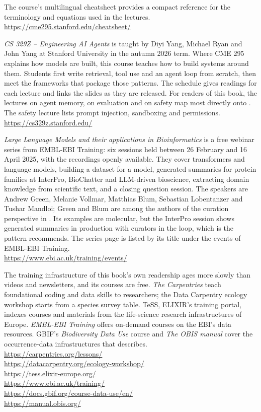 The course's multilingual cheatsheet provides a compact reference for the
terminology and equations used in the lectures.\\
\url{https://cme295.stanford.edu/cheatsheet/}

\emph{CS 329Z -- Engineering AI Agents} is taught by Diyi Yang, Michael Ryan
and John Yang at Stanford University in the autumn 2026 term. Where CME 295
explains how models are built, this course teaches how to build systems
around them. Students first write retrieval, tool use and an agent loop from
scratch, then meet the frameworks that package those patterns. The schedule
gives readings for each lecture and links the slides as they are released.
For readers of this book, the lectures on agent memory, on evaluation and on
safety map most directly onto . The
safety lecture lists prompt injection, sandboxing and permissions.\\
\url{https://cs329z.stanford.edu/}

\emph{Large Language Models and their applications in Bioinformatics} is a
free webinar series from EMBL-EBI Training: six sessions held between
26 February and 16 April 2025, with the recordings openly available. They
cover transformers and language models, building a dataset for a model,
generated summaries for protein families at InterPro, BioChatter and
LLM-driven bioscience, extracting domain knowledge from scientific text, and
a closing question session. The speakers are Andrew Green, Melanie Vollmar,
Matthias Blum, Sebastian Lobentanzer and Tushar Mandloi; Green and Blum are
among the authors of the curation perspective in . Its
examples are molecular, but the InterPro session shows generated summaries
in production with curators in the loop, which is the pattern
 recommends. The series page is listed by its title
under the events of EMBL-EBI Training.\\
\url{https://www.ebi.ac.uk/training/events/}

The training infrastructure of this book's own readership ages more slowly
than videos and newsletters, and its courses are free. \emph{The
Carpentries} teach foundational coding and data skills to researchers; the
Data Carpentry ecology workshop starts from a species survey table. TeSS,
ELIXIR's training portal, indexes courses and materials from the life-science
research infrastructures of Europe. \emph{EMBL-EBI Training} offers
on-demand courses on the EBI's data resources. GBIF's \emph{Biodiversity
Data Use} course and \emph{The OBIS manual} cover the occurrence-data
infrastructures that  describes.\\
\url{https://carpentries.org/lessons/}\\
\url{https://datacarpentry.org/ecology-workshop/}\\
\url{https://tess.elixir-europe.org/}\\
\url{https://www.ebi.ac.uk/training/}\\
\url{https://docs.gbif.org/course-data-use/en/}\\
\url{https://manual.obis.org/}

